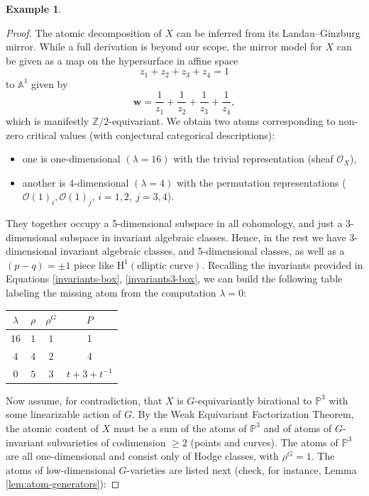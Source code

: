 \documentclass[12pt,a4paper]{amsart}
\theoremstyle{definition}
\newtheorem{example}[theorem]{Example}
\theoremstyle{remark}
\begin{document}
\begin{example}
\begin{proof}
The atomic decomposition of $X$ can be inferred from its Landau–Ginzburg mirror. While a full derivation is beyond our scope, the mirror model for $X$ can be given as a map on the hypersurface in affine space 
\[
z_1 + z_2 + z_3 + z_4 = 1
\] 
to \(\mathbb{A}^1\) given by
\[
\boldsymbol{w} = \frac{1}{z_1} + \frac{1}{z_2} + \frac{1}{z_3} + \frac{1}{z_4},
\]
which is manifestly \(\mathbb Z/2\)-equivariant.  We obtain two atoms corresponding to non-zero critical values (with conjectural categorical descriptions):
\begin{itemize}
    \item one is one-dimensional $(\lambda =16)$ with the trivial representation (sheaf \(\mathcal{O}_X\)), 
    \item another is 4-dimensional $(\lambda=4)$ with the permutation representations (\(\mathcal{O}(1)_i,\mathcal O(1)_j\), \(i=1,2,~j=3,4\)).
\end{itemize}

They together occupy a 5-dimensional subspace in all cohomology, and just a 3-dimensional subspace in invariant algebraic classes. Hence, in the rest we have \(3\)-dimensional invariant algebraic classes, and 5-dimensional classes, as well as a \((p-q)=\pm 1\) piece like \(\mathrm{H}^1(\text{elliptic curve})\). Recalling the invariants provided in Equations \eqref{invariants-box}, \eqref{invariants3-box}, we can build the following table labeling the missing atom from the computation $\lambda=0$:

\begin{table}[H]
    \centering
    \begin{tabular}{|c|c|c|c|}
     \hline $\lambda$  & $\rho$  & $\rho^G$ & $P$\\ \hline \hline
      $16$   & $1$ & $1$ & 1 \\ \hline
      $4$   &  $4$ & $2$ &4\\ \hline
    $0$  & $5$ & $3$ &  $t+3+t^{-1}$\\ \hline
    \end{tabular}
    \label{tab:invariants}
    \end{table}

Now assume, for contradiction, that $X$ is $G$-equivariantly birational to $\mathbb{P}^3$ with some linearizable action of $G$. By the Weak Equivariant Factorization Theorem, the atomic content of $X$ must be a sum of the atoms of $\mathbb{P}^3$ and of atoms of $G$-invariant subvarieties of codimension $\geq 2$ (points and curves). The atoms of $\mathbb{P}^3$ are all one-dimensional and consist only of Hodge classes, with $\rho^G=1$. The atoms of low-dimensional $G$-varieties are listed next (check, for instance, Lemma \ref{lem:atom-generators}):


\end{proof}
\end{example}
\end{document}
